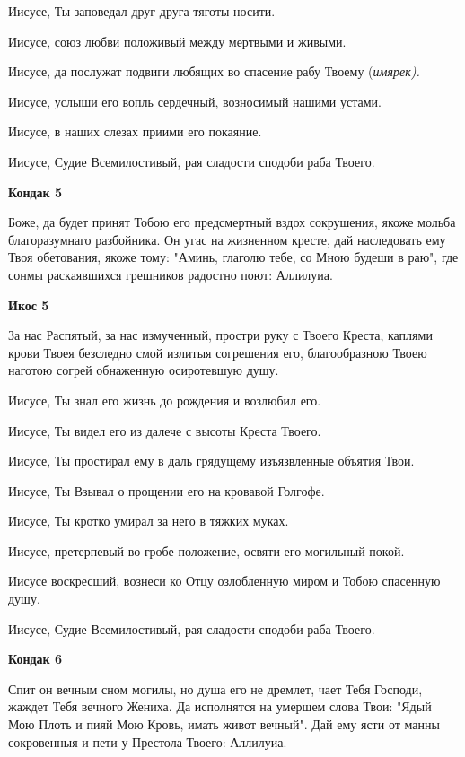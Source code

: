 Иисусе, Ты заповедал друг друга тяготы носити. 

Иисусе, союз любви положивый между мертвыми и живыми. 

Иисусе, да послужат подвиги любящих во спасение рабу Твоему (\itshape имярек\normalfont{}). 

Иисусе, услыши его вопль сердечный, возносимый нашими устами. 

Иисусе, в наших слезах приими его покаяние. 

Иисусе, Судие Всемилостивый, рая сладости сподоби раба Твоего.


\medskip


\bfseries Кондак 5\normalfont{}


Боже, да будет принят Тобою его предсмертный вздох сокрушения, якоже мольба благоразумнаго разбойника. Он угас на жизненном кресте, дай наследовать ему Твоя обетования, якоже тому: "Аминь, глаголю тебе, со Мною будеши в раю", где сонмы раскаявшихся грешников радостно поют: Аллилуиа.


\medskip


\bfseries Икос 5\normalfont{}


За нас Распятый, за нас измученный, простри руку с Твоего Креста, каплями крови Твоея безследно смой излитыя согрешения его, благообразною Твоею наготою согрей обнаженную осиротевшую душу. 

Иисусе, Ты знал его жизнь до рождения и возлюбил его. 

Иисусе, Ты видел его из далече с высоты Креста Твоего. 

Иисусе, Ты простирал ему в даль грядущему изъязвленные объятия Твои. 

Иисусе, Ты Взывал о прощении его на кровавой Голгофе. 

Иисусе, Ты кротко умирал за него в тяжких муках. 

Иисусе, претерпевый во гробе положение, освяти его могильный покой. 

Иисусе воскресший, вознеси ко Отцу озлобленную миром и Тобою спасенную душу. 

Иисусе, Судие Всемилостивый, рая сладости сподоби раба Твоего.


\medskip


\bfseries Кондак 6\normalfont{}


Спит он вечным сном могилы, но душа его не дремлет, чает Тебя Господи, жаждет Тебя вечного Жениха. Да исполнятся на умершем слова Твои: "Ядый Мою Плоть и пияй Мою Кровь, имать живот вечный". Дай ему ясти от манны сокровенныя и пети у Престола Твоего: Аллилуиа.


